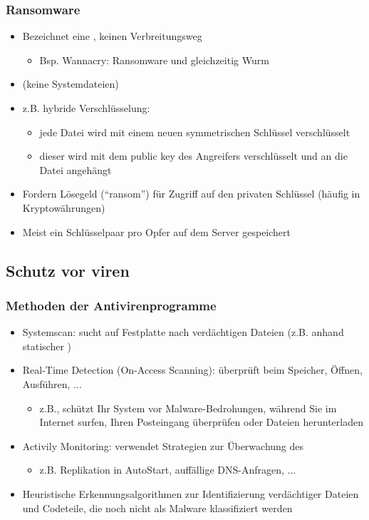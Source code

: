 \subsubsection*{Ransomware}
\begin{itemize}
    \item Bezeichnet eine , keinen Verbreitungsweg
    \begin{itemize}
        \item Bsp. Wannacry: Ransomware und gleichzeitig Wurm
    \end{itemize}
    \item {} (keine Systemdateien)
    \item z.B. hybride Verschlüsselung:
    \begin{itemize}
        \item jede Datei wird mit einem neuen symmetrischen Schlüssel verschlüsselt
        \item dieser wird mit dem public key des Angreifers verschlüsselt und an die Datei angehängt
    \end{itemize}
    \item Fordern Lösegeld (\enquote{ransom}) für Zugriff auf den privaten Schlüssel (häufig in Kryptowährungen)
    \item Meist ein Schlüsselpaar pro Opfer auf dem Server gespeichert
\end{itemize}
\subsection{Schutz vor viren}
\subsubsection*{Methoden der Antivirenprogramme}
\begin{itemize}
    \item Systemscan: sucht auf Festplatte nach verdächtigen Dateien (z.B. anhand statischer )
    \item Real-Time Detection (On-Access Scanning): überprüft beim Speicher, Öffnen, Ausführen, ...
    \begin{itemize}
        \item z.B., schützt Ihr System vor Malware-Bedrohungen, während Sie im Internet surfen, Ihren Posteingang überprüfen oder Dateien herunterladen
    \end{itemize}
\end{itemize}
\begin{itemize}
    \item Activily Monitoring: verwendet Strategien zur Überwachung des 
    \begin{itemize}
        \item z.B. Replikation in AutoStart, auffällige DNS-Anfragen, ...
    \end{itemize}
    \item Heuristische Erkennungsalgorithmen zur Identifizierung verdächtiger Dateien und Codeteile, die noch nicht als Malware klassifiziert werden
\end{itemize}
